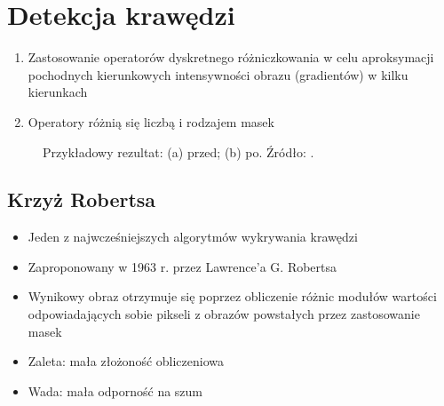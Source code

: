 \documentclass[a4paper,twocolumn,12pt]{article}
\begin{document}
\section{Detekcja krawędzi}

\begin{enumerate}
 \item Zastosowanie operatorów dyskretnego różniczkowania w celu aproksymacji pochodnych kierunkowych intensywności obrazu (gradientów) w kilku kierunkach
 \item Operatory różnią się liczbą i rodzajem masek
\end{enumerate}

\begin{figure}[!ht]
 \begin{center}
 \end{center}
 \caption{
  Przykładowy rezultat:
  (a) przed;
  (b) po.
  Źródło: \cite{roberts}.
 }
 \label{fig:edges_example}
\end{figure}


\subsection{Krzyż Robertsa}

\begin{itemize}
 \item Jeden z najwcześniejszych algorytmów wykrywania krawędzi
 \item Zaproponowany w 1963 r. przez Lawrence’a G. Robertsa
 \item Wynikowy obraz otrzymuje się poprzez obliczenie różnic modułów wartości odpowiadających sobie pikseli z obrazów powstałych przez zastosowanie masek
 \item Zaleta: mała złożoność obliczeniowa
 \item Wada: mała odporność na szum
\end{itemize}
\end{document}
